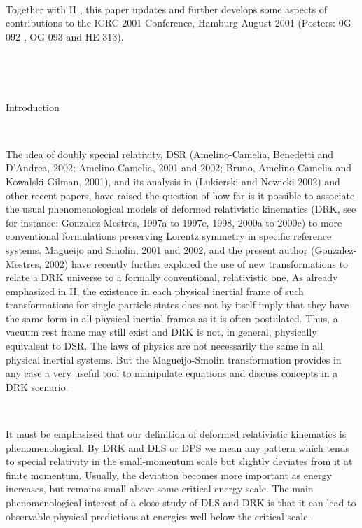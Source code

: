 \documentclass[a4paper,12pt,dvips]{article}
\makeatletter
\renewcommand{\section}{\@startsection{section}{1}{0in}
	{0.4\baselineskip}{0.1\baselineskip}{\Large\bf}}
\makeatother
\begin{document}
~ 

Together with II , this paper updates and further develops some aspects
of contributions to the ICRC 2001 Conference, Hamburg August 2001 (Posters: 0G 092 , OG 093 and HE 313).
~
%
~
\vspace{1ex}

~

%
%
~ 

\section{Introduction}
\label{introduction.sec}

~
~ 

The idea of doubly special relativity, DSR (Amelino-Camelia, Benedetti and D'Andrea, 2002; Amelino-Camelia, 2001 and 2002; Bruno, Amelino-Camelia and Kowalski-Gilman, 2001), and its analysis in (Lukierski and Nowicki 2002) and other recent papers, have raised the question of how far is it possible to associate the usual phenomenological models of deformed relativistic kinematics (DRK, see for instance: Gonzalez-Mestres, 1997a to 1997e, 1998, 2000a to 2000c) to more conventional formulations preserving Lorentz symmetry in specific reference systems. Magueijo and Smolin, 2001 and 2002, and the present author (Gonzalez-Mestres, 2002) have recently further explored the use of new transformations to relate a DRK universe to a formally conventional, relativistic one. As already emphasized in II, the existence in each physical inertial frame of such transformations for single-particle states does not by itself imply that they have the same form in all physical inertial frames as it is often postulated. Thus, a vacuum rest frame may still exist and DRK is not, in general, physically equivalent to DSR. The laws of physics are not necessarily the same in all physical inertial systems. But the Magueijo-Smolin transformation provides in any case a very useful tool to manipulate equations and discuss concepts in a DRK scenario.

~

It must be emphasized that our definition of deformed relativistic kinematics is phenomenological. By DRK and DLS or DPS we mean any pattern which tends to special relativity in the small-momentum scale but slightly deviates from it at finite momentum. Usually, the deviation becomes more important as energy increases, but remains small above some critical energy scale. The main phenomenological interest of a close study of DLS and DRK is that it can lead to observable physical predictions at energies well below the critical scale.
\end{document}
